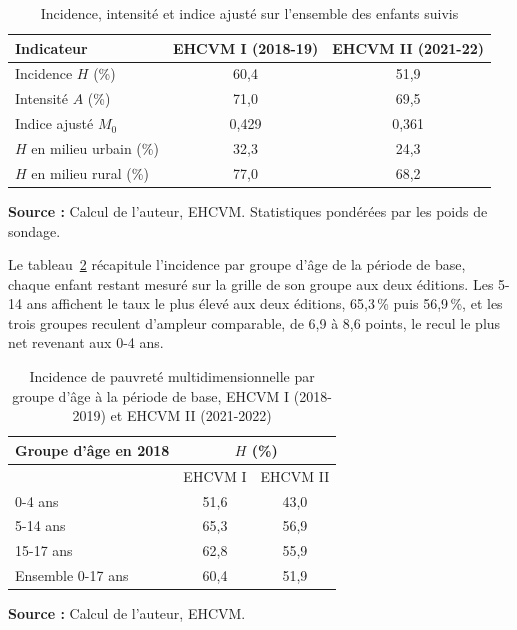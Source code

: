 \begin{table}[H]
	\centering
	\caption{Incidence, intensité et indice ajusté sur l'ensemble des enfants suivis}
	\label{tab:moda_ensemble}
	\zebre
	\begin{tabular}{|l|c|c|}
		\hline
		\entete Indicateur & EHCVM I (2018-19) & EHCVM II (2021-22) \\
		\hline
		Incidence $H$ (\%)          & 60,4 & 51,9 \\ \hline
		Intensité $A$ (\%)          & 71,0 & 69,5 \\ \hline
		Indice ajusté $M_0$         & 0,429 & 0,361 \\ \hline
		$H$ en milieu urbain (\%)   & 32,3 & 24,3 \\ \hline
		$H$ en milieu rural (\%)    & 77,0 & 68,2 \\
		\hline
	\end{tabular}

	{\footnotesize \textbf{Source :} Calcul de l'auteur, EHCVM. Statistiques
	pondérées par les poids de sondage.}
\end{table}

Le tableau~\ref{tab:moda_age} récapitule l'incidence par groupe d'âge de la
période de base, chaque enfant restant mesuré sur la grille de son groupe
aux deux éditions. Les 5-14 ans affichent le taux le plus élevé aux deux
éditions, 65,3\,\% puis 56,9\,\%, et les trois groupes reculent d'ampleur
comparable, de 6,9 à 8,6 points, le recul le plus net revenant aux 0-4
ans.

\begin{table}[H]
	\centering
	\caption{Incidence de pauvreté multidimensionnelle par groupe d'âge à la période de base, EHCVM I (2018-2019) et EHCVM II (2021-2022)}
	\label{tab:moda_age}
	\zebre
	\begin{tabular}{|l|c|c|}
		\hline
		\entete Groupe d'âge en 2018 & \multicolumn{2}{|c|}{$H$ (\%)} \\ \hline

		& EHCVM I & EHCVM II \\
		\hline
		0-4 ans     & 51,6 & 43,0 \\ \hline
		5-14 ans    & 65,3 & 56,9 \\ \hline
		15-17 ans   & 62,8 & 55,9 \\
		\hline
		Ensemble 0-17 ans & 60,4 & 51,9 \\
		\hline
	\end{tabular}

	{\footnotesize \textbf{Source :} Calcul de l'auteur, EHCVM.}
\end{table}

